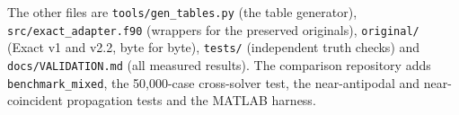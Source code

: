 \documentclass[11pt]{article}
\newcommand{\code}[1]{\texttt{#1}}
\begin{document}
The other files are \code{tools/gen\_tables.py} (the table generator), \code{src/exact\_adapter.f90} (wrappers for the preserved originals), \code{original/} (Exact v1 and v2.2, byte for byte), \code{tests/} (independent truth checks) and \code{docs/VALIDATION.md} (all measured results). The comparison repository adds \code{benchmark\_mixed}, the 50,000-case cross-solver test, the near-antipodal and near-coincident propagation tests and the MATLAB harness.
\end{document}
